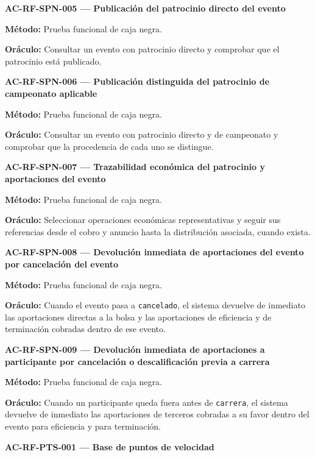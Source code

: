 \documentclass[10pt,letterpaper]{article}
\begin{document}
\noindent\textbf{AC-RF-SPN-005 --- Publicación del patrocinio directo del evento}\par
\textbf{Método:} Prueba funcional de caja negra.\par
\textbf{Oráculo:} Consultar un evento con patrocinio directo y comprobar que el patrocinio está publicado.\par\vspace{0.45em}
\noindent\textbf{AC-RF-SPN-006 --- Publicación distinguida del patrocinio de campeonato aplicable}\par
\textbf{Método:} Prueba funcional de caja negra.\par
\textbf{Oráculo:} Consultar un evento con patrocinio directo y de campeonato y comprobar que la procedencia de cada uno se distingue.\par\vspace{0.45em}
\noindent\textbf{AC-RF-SPN-007 --- Trazabilidad económica del patrocinio y aportaciones del evento}\par
\textbf{Método:} Prueba funcional de caja negra.\par
\textbf{Oráculo:} Seleccionar operaciones económicas representativas y seguir sus referencias desde el cobro y anuncio hasta la distribución asociada, cuando exista.\par\vspace{0.45em}
\noindent\textbf{AC-RF-SPN-008 --- Devolución inmediata de aportaciones del evento por cancelación del evento}\par
\textbf{Método:} Prueba funcional de caja negra.\par
\textbf{Oráculo:} Cuando el evento pasa a \texttt{cancelado}, el sistema devuelve de inmediato las aportaciones directas a la bolsa y las aportaciones de eficiencia y de terminación cobradas dentro de ese evento.\par\vspace{0.45em}
\noindent\textbf{AC-RF-SPN-009 --- Devolución inmediata de aportaciones a participante por cancelación o descalificación previa a carrera}\par
\textbf{Método:} Prueba funcional de caja negra.\par
\textbf{Oráculo:} Cuando un participante queda fuera antes de \texttt{carrera}, el sistema devuelve de inmediato las aportaciones de terceros cobradas a su favor dentro del evento para eficiencia y para terminación.\par\vspace{0.45em}
\noindent\textbf{AC-RF-PTS-001 --- Base de puntos de velocidad}\par
\end{document}
